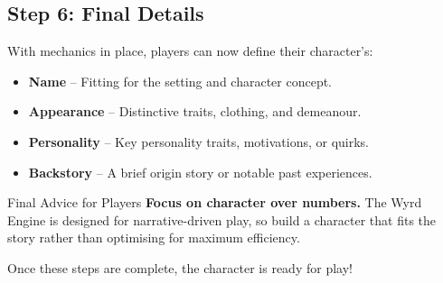 \subsection{Step 6: Final Details}

With mechanics in place, players can now define their character’s:
\begin{itemize}
    \item \textbf{Name} – Fitting for the setting and character concept.
    \item \textbf{Appearance} – Distinctive traits, clothing, and demeanour.
    \item \textbf{Personality} – Key personality traits, motivations, or quirks.
    \item \textbf{Backstory} – A brief origin story or notable past experiences.
\end{itemize}

\begin{DndComment}{Final Advice for Players}
\textbf{Focus on character over numbers.} The Wyrd Engine is designed for narrative-driven play, so build a character that fits the story rather than optimising for maximum efficiency.
\end{DndComment}

Once these steps are complete, the character is ready for play!




